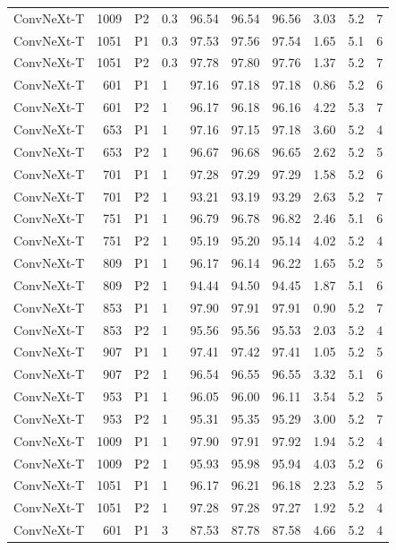 {\begin{longtable}{lrllrrrrrr}
ConvNeXt-T & 1009 & P2 & 0.3 & 96.54 & 96.54 & 96.56 & 3.03 & 5.2 & 7 \\
ConvNeXt-T & 1051 & P1 & 0.3 & 97.53 & 97.56 & 97.54 & 1.65 & 5.1 & 6 \\
ConvNeXt-T & 1051 & P2 & 0.3 & 97.78 & 97.80 & 97.76 & 1.37 & 5.2 & 7 \\
ConvNeXt-T & 601 & P1 & 1 & 97.16 & 97.18 & 97.18 & 0.86 & 5.2 & 6 \\
ConvNeXt-T & 601 & P2 & 1 & 96.17 & 96.18 & 96.16 & 4.22 & 5.3 & 7 \\
ConvNeXt-T & 653 & P1 & 1 & 97.16 & 97.15 & 97.18 & 3.60 & 5.2 & 4 \\
ConvNeXt-T & 653 & P2 & 1 & 96.67 & 96.68 & 96.65 & 2.62 & 5.2 & 5 \\
ConvNeXt-T & 701 & P1 & 1 & 97.28 & 97.29 & 97.29 & 1.58 & 5.2 & 6 \\
ConvNeXt-T & 701 & P2 & 1 & 93.21 & 93.19 & 93.29 & 2.63 & 5.2 & 7 \\
ConvNeXt-T & 751 & P1 & 1 & 96.79 & 96.78 & 96.82 & 2.46 & 5.1 & 6 \\
ConvNeXt-T & 751 & P2 & 1 & 95.19 & 95.20 & 95.14 & 4.02 & 5.2 & 4 \\
ConvNeXt-T & 809 & P1 & 1 & 96.17 & 96.14 & 96.22 & 1.65 & 5.2 & 5 \\
ConvNeXt-T & 809 & P2 & 1 & 94.44 & 94.50 & 94.45 & 1.87 & 5.1 & 6 \\
ConvNeXt-T & 853 & P1 & 1 & 97.90 & 97.91 & 97.91 & 0.90 & 5.2 & 7 \\
ConvNeXt-T & 853 & P2 & 1 & 95.56 & 95.56 & 95.53 & 2.03 & 5.2 & 4 \\
ConvNeXt-T & 907 & P1 & 1 & 97.41 & 97.42 & 97.41 & 1.05 & 5.2 & 5 \\
ConvNeXt-T & 907 & P2 & 1 & 96.54 & 96.55 & 96.55 & 3.32 & 5.1 & 6 \\
ConvNeXt-T & 953 & P1 & 1 & 96.05 & 96.00 & 96.11 & 3.54 & 5.2 & 5 \\
ConvNeXt-T & 953 & P2 & 1 & 95.31 & 95.35 & 95.29 & 3.00 & 5.2 & 7 \\
ConvNeXt-T & 1009 & P1 & 1 & 97.90 & 97.91 & 97.92 & 1.94 & 5.2 & 4 \\
ConvNeXt-T & 1009 & P2 & 1 & 95.93 & 95.98 & 95.94 & 4.03 & 5.2 & 6 \\
ConvNeXt-T & 1051 & P1 & 1 & 96.17 & 96.21 & 96.18 & 2.23 & 5.2 & 5 \\
ConvNeXt-T & 1051 & P2 & 1 & 97.28 & 97.28 & 97.27 & 1.92 & 5.2 & 4 \\
ConvNeXt-T & 601 & P1 & 3 & 87.53 & 87.78 & 87.58 & 4.66 & 5.2 & 4 \\

\end{longtable}}

